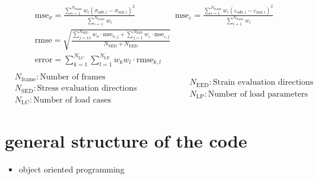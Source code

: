     \begin{center}
        \begin{gather}
            \text{mse}_{\sigma} = \frac{\displaystyle\sum_{i=1}^{N_\text{frame}} w_i (\sigma_{odb,i} - \sigma_{md,i})^2}{\displaystyle\sum_{i=1}^{N_\text{frame}}w_i } 
            \hspace{2cm}
            \text{mse}_{\varepsilon} = \frac{\displaystyle\sum_{i=1}^{N_{\text{frame}}} w_i (\varepsilon_{odb,i} - \varepsilon_{md,i})^2}{\displaystyle\sum_{i=1}^{N_\text{frame}}w_i } \\
            \text{rmse} = \sqrt{\frac{\displaystyle\sum_{j=xx}^{N_\text{SED}} w_{\sigma} \cdot \text{mse}_{\sigma,j} + \displaystyle\sum_{j=1}^{N_\text{EED}} w_{\varepsilon} \cdot \text{mse}_{\varepsilon,j}}{N_\text{SED} + N_\text{EED}}} \\
            \text{error} = \sum_{k=1}^{N_\text{LC}} \sum_{l=1}^{N_\text{LP}} w_k w_l \cdot \text{rmse}_{k,l}  \\
        \end{gather}
        \begin{equation*}
            \begin{split}
                &N_{\text{frame}}: \text{Number of frames}\\
                &N_\text{SED}: \text{Stress evaluation directions}\\
                &N_{\text{LC}}: \text{Number of load cases}
            \end{split}
            \hspace{2cm}
            \begin{split}
                &N_\text{EED}: \text{Strain evaluation directions}\\
                &N_{\text{LP}}: \text{Number of load parameters}
            \end{split}
        \end{equation*}
    \end{center}
    
 
    
    

    

    \section{general structure of the code}

    \begin{itemize}
        \item object oriented programming
    \end{itemize}
    
